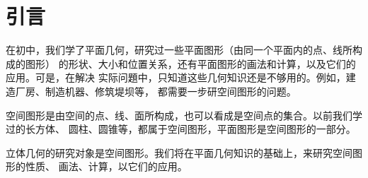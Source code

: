 \chapter*{引言}

在初中，我们学了平面几何，研究过一些平面图形（由同一个平面内的点、线所构成的图形）
的形状、大小和位置关系，还有平面图形的画法和计算，以及它们的应用。可是，在解决
实际问題中，只知道这些几何知识还是不够用的。例如，建造厂房、制造机器、修筑堤坝等，
都需要一步研空间图形的问题。

空间图形是由空间的点、线、面所构成，也可以看成是空间点的集合。以前我们学过的长方体、
圆柱、圆锥等，都属于空间图形，平面图形是空间图形的一部分。

立体几何的研究对象是空间图形。我们将在平面几何知识的基础上，来研究空间图形的性质、
画法、计算，以它们的应用。
